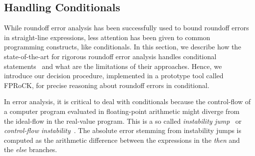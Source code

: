 \subsection{Handling Conditionals}
\label{conditionals}
%
While roundoff error analysis has been successfully used to bound roundoff errors in straight-line expressions, less attention has been given to common programming constructs, like conditionals.
%
In this section, we describe how the state-of-the-art for rigorous roundoff error analysis handles conditional statements~\cite{precisa, fluctuat} and what are the limitations of their approaches.
%
Hence, we introduce our decision procedure, implemented in a prototype tool called FPRoCK, for precise reasoning about roundoff errors in conditional.
%

In error analysis, it is critical to deal with conditionals because the control-flow of a computer program evaluated in floating-point arithmetic might diverge from the ideal-flow in the real-value program.
%
%
This is a so called \emph{instability jump}~\cite{satire} or \emph{control-flow instability}~\cite{unstable}.
%
The absolute error stemming from instability jumps is computed as the arithmetic difference between the expressions in the \emph{then} and the \emph{else} branches.
%
%

